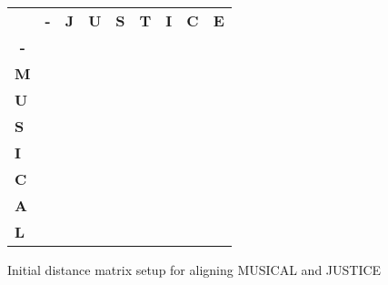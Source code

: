 \begin{figure}[!h]
\centering
\begin{tabular}{lllllllll}
                                & \multicolumn{1}{c}{\textbf{-}} & \textbf{J}            & \textbf{U}            & \textbf{S}            & \textbf{T}            & \textbf{I}            & \textbf{C}            & \textbf{E}            \\ \cline{2-9} 
\multicolumn{1}{c|}{\textbf{-}} & \multicolumn{1}{l|}{}          & \multicolumn{1}{l|}{} & \multicolumn{1}{l|}{} & \multicolumn{1}{l|}{} & \multicolumn{1}{l|}{} & \multicolumn{1}{l|}{} & \multicolumn{1}{l|}{} & \multicolumn{1}{l|}{} \\ \cline{2-9} 
\multicolumn{1}{l|}{\textbf{M}} & \multicolumn{1}{l|}{}          & \multicolumn{1}{l|}{} & \multicolumn{1}{l|}{} & \multicolumn{1}{l|}{} & \multicolumn{1}{l|}{} & \multicolumn{1}{l|}{} & \multicolumn{1}{l|}{} & \multicolumn{1}{l|}{} \\ \cline{2-9} 
\multicolumn{1}{l|}{\textbf{U}} & \multicolumn{1}{l|}{}          & \multicolumn{1}{l|}{} & \multicolumn{1}{l|}{} & \multicolumn{1}{l|}{} & \multicolumn{1}{l|}{} & \multicolumn{1}{l|}{} & \multicolumn{1}{l|}{} & \multicolumn{1}{l|}{} \\ \cline{2-9} 
\multicolumn{1}{l|}{\textbf{S}} & \multicolumn{1}{l|}{}          & \multicolumn{1}{l|}{} & \multicolumn{1}{l|}{} & \multicolumn{1}{l|}{} & \multicolumn{1}{l|}{} & \multicolumn{1}{l|}{} & \multicolumn{1}{l|}{} & \multicolumn{1}{l|}{} \\ \cline{2-9} 
\multicolumn{1}{l|}{\textbf{I}} & \multicolumn{1}{l|}{}          & \multicolumn{1}{l|}{} & \multicolumn{1}{l|}{} & \multicolumn{1}{l|}{} & \multicolumn{1}{l|}{} & \multicolumn{1}{l|}{} & \multicolumn{1}{l|}{} & \multicolumn{1}{l|}{} \\ \cline{2-9} 
\multicolumn{1}{l|}{\textbf{C}} & \multicolumn{1}{l|}{}          & \multicolumn{1}{l|}{} & \multicolumn{1}{l|}{} & \multicolumn{1}{l|}{} & \multicolumn{1}{l|}{} & \multicolumn{1}{l|}{} & \multicolumn{1}{l|}{} & \multicolumn{1}{l|}{} \\ \cline{2-9} 
\multicolumn{1}{l|}{\textbf{A}} & \multicolumn{1}{l|}{}          & \multicolumn{1}{l|}{} & \multicolumn{1}{l|}{} & \multicolumn{1}{l|}{} & \multicolumn{1}{l|}{} & \multicolumn{1}{l|}{} & \multicolumn{1}{l|}{} & \multicolumn{1}{l|}{} \\ \cline{2-9} 
\multicolumn{1}{l|}{\textbf{L}}   & \multicolumn{1}{l|}{}          & \multicolumn{1}{l|}{} & \multicolumn{1}{l|}{} & \multicolumn{1}{l|}{} & \multicolumn{1}{l|}{} & \multicolumn{1}{l|}{} & \multicolumn{1}{l|}{} & \multicolumn{1}{l|}{} \\ \cline{2-9} 
\end{tabular}
\caption{Initial distance matrix setup for aligning MUSICAL and JUSTICE}
\label{alignsetup}
\end{figure}

